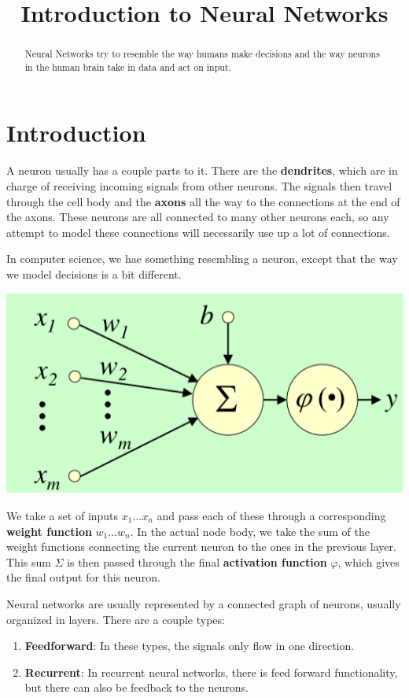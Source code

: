 \documentclass{tufte-handout}
\title{Introduction to Neural Networks}
\begin{document}
\maketitle
\begin{abstract}
Neural Networks try to resemble the way humans make decisions and the 
way neurons in the human brain take in data and act on input.
\end{abstract}

\section{Introduction}
A neuron usually has a couple parts to it. There are the \textbf{dendrites}, which are in charge of
	receiving incoming signals from other neurons. 
The signals then travel through the cell body and the \textbf{axons} all the way to the connections at the 
	end of the axons.
These neurons are all connected to many other neurons each, so any attempt to model these connections will
	necessarily use up a lot of connections.

In computer science, we hae something resembling a neuron, except that the way we model decisions is a bit 
	different. 

\begin{marginfigure}
	\includegraphics[scale=0.3]{nn_diagram}
	\caption{We take a set of inputs $x_{1}\dots x_{n}$ and pass each of these through a corresponding 
		\textbf{weight function} $w_{1}\dots w_{n}$. In the actual node body, we take the sum of the weight
		functions connecting the current neuron to the ones in the previous layer. This sum $\Sigma$ is then 
		passed through the final \textbf{activation function} $\varphi$, which gives the final output for this
		neuron.}
\end{marginfigure}

Neural networks are usually represented by a connected graph of neurons, usually organized in layers. 
There are a couple types:
\begin{enumerate}
	\item \textbf{Feedforward}: In these types, the signals only flow in one direction.
	\item \textbf{Recurrent}: In recurrent neural networks, there is feed forward functionality, but 
			there can also be feedback to the neurons.
\end{enumerate}
\end{document}

